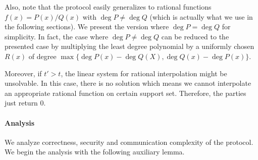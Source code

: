 Also, note that the protocol easily generalizes to rational functions $f(x)=P(x)/Q(x)$ with $\deg P\neq \deg Q$ (which is actually what we use in the following sections). We present the version where $\deg P= \deg Q$ for simplicity. In fact, the case where $\deg P\neq \deg Q$ can be reduced to the presented case by multiplying the least degree polynomial by a uniformly chosen $R(x)$ of degree $\max\{\deg P(x)-\deg Q(X), \deg Q(x)-\deg P(x)\}$.

Moreover, if $t'>t$, the linear system for rational interpolation might be unsolvable. In this case, there is no solution which means we cannot interpolate an appropriate rational function on certain support set. Therefore, the parties just return $0$.


\paragraph{Analysis} We analyze correctness, security and communication complexity of the protocol. We begin the analysis with the following auxiliary lemma.

